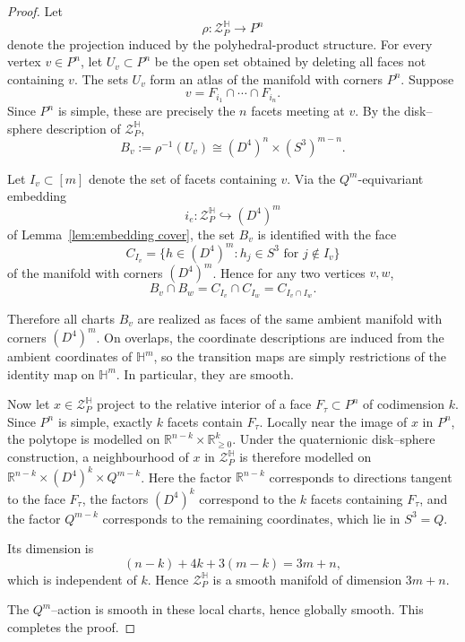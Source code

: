 \documentclass[11pt,a4paper]{article}
\numberwithin{equation}{section}
\theoremstyle{named}
\begin{document}
\begin{proof}
Let
\[
\rho:\mathcal Z_P^{\mathbb H}\longrightarrow P^n
\]
denote the projection induced by the polyhedral-product structure. For every vertex \(v\in P^n\), let \(U_v\subset P^n\) be the open set obtained by deleting all faces not containing \(v\). The sets \(U_v\) form an atlas of the manifold with corners \(P^n\). Suppose
\[
v=F_{i_1}\cap\cdots\cap F_{i_n}.
\]
Since \(P^n\) is simple, these are precisely the \(n\) facets meeting at \(v\). By the disk--sphere description of \(\mathcal Z_P^{\mathbb H}\),
\[
B_v:=\rho^{-1}(U_v) \cong (D^4)^n\times (S^3)^{m-n}.
\]

Let \(I_v\subset[m]\) denote the set of facets containing \(v\). Via the \(Q^m\)-equivariant embedding
\[
i_e:\mathcal Z_P^{\mathbb H}\hookrightarrow (D^4)^m
\]
of Lemma~\ref{lem:embedding cover}, the set \(B_v\) is identified with the face
\[
C_{I_v} = \{h\in (D^4)^m : h_j\in S^3 \text{ for } j\notin I_v\}
\]
of the manifold with corners \((D^4)^m\). Hence for any two vertices \(v,w\),
\[
B_v\cap B_w = C_{I_v}\cap C_{I_w} = C_{I_v\cap I_w}.
\]

Therefore all charts \(B_v\) are realized as faces of the same ambient manifold with corners \((D^4)^m\). On overlaps, the coordinate descriptions are induced from the ambient coordinates of \(\mathbb H^m\), so the transition maps are simply restrictions of the identity map on \(\mathbb H^m\). In particular, they are smooth.

Now let \(x\in \mathcal Z_P^{\mathbb H}\) project to the relative interior of a face \(F_\tau\subset P^n\) of codimension \(k\). Since \(P^n\) is simple, exactly \(k\) facets contain \(F_\tau\). Locally near the image of \(x\) in \(P^n\), the polytope is modelled on \(\mathbb R^{n-k}\times \mathbb R_{\geq 0}^{k}\). Under the quaternionic disk--sphere construction, a neighbourhood of \(x\) in \(\mathcal Z_P^{\mathbb H}\) is therefore modelled on \(\mathbb R^{n-k}\times (D^4)^k\times Q^{m-k}\). Here the factor \(\mathbb R^{n-k}\) corresponds to directions tangent to the face \(F_\tau\), the factors \((D^4)^k\) correspond to the \(k\) facets containing \(F_\tau\), and the factor \(Q^{m-k}\) corresponds to the remaining coordinates, which lie in \(S^3=Q\).

Its dimension is
\[(n-k)+4k+3(m-k)=3m+n,\]
which is independent of \(k\). Hence \(\mathcal Z_P^{\mathbb H}\) is a smooth manifold of dimension \(3m+n\).

The $Q^m$–action is smooth in these local charts, hence globally smooth. This completes the proof.
\end{proof}
\end{document}
